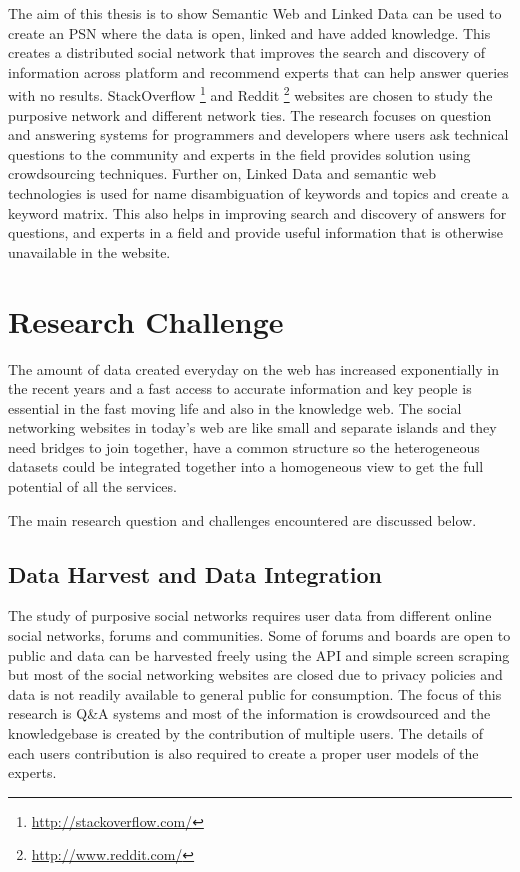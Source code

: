 The aim of this thesis is to show Semantic Web and Linked Data can be used to create an PSN where the data is open, linked and have added knowledge. This creates a distributed social network that improves the search and discovery of information across platform and recommend experts that can help answer queries with no results. StackOverflow \footnote{\url{http://stackoverflow.com/}} and Reddit \footnote{\url{http://www.reddit.com/}} websites are chosen to study the purposive network and different network ties. The research focuses on question and answering systems for programmers and developers where users ask technical questions to the community and experts in the field provides solution using crowdsourcing techniques. Further on, Linked Data and semantic web technologies is used for name disambiguation of keywords and topics and create a keyword matrix. This also helps in improving search and discovery of answers for questions, and experts in a field and provide useful information that is otherwise unavailable in the website.


\section{Research Challenge}

The amount of data created everyday on the web has increased exponentially in the recent years and a fast access to accurate information and key people is essential in the fast moving life and also in the knowledge web. The social networking websites in today's web are like small and separate islands and they need bridges to join together, have a common structure so the heterogeneous datasets could be integrated together into a homogeneous view to get the full potential of  all the services.


The main research question and challenges encountered are discussed below.


\subsection{Data Harvest and Data Integration}

The study of purposive social networks requires user data from different online social networks, forums and communities. Some of forums and boards are open to public and data can be harvested freely using the API and simple screen scraping but most of the social networking websites are closed due to privacy policies and data is not readily available to general public for consumption. The focus of this research is Q&A systems and most of the information is crowdsourced and the knowledgebase is created by the contribution of multiple users. The details of each users contribution is also required to create a proper user models of the experts. 

